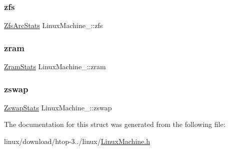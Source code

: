 \mbox{\label{structLinuxMachine___afe18771dfc5352b17d406684ffde417e}} 
\subsubsection{\texorpdfstring{zfs}{zfs}}
{\footnotesize\ttfamily \hyperlink{ZfsArcStats_8h_a2adeccbbba50329f61d34f355e5faddc}{Zfs\+Arc\+Stats} Linux\+Machine\+\_\+\+::zfs}

\mbox{\label{structLinuxMachine___a5118fe9fa61b7db30c667a58b2ede233}} 
\subsubsection{\texorpdfstring{zram}{zram}}
{\footnotesize\ttfamily \hyperlink{ZramStats_8h_a6d52e5ca55176157f75983edcee3edb3}{Zram\+Stats} Linux\+Machine\+\_\+\+::zram}

\mbox{\label{structLinuxMachine___a4b5e481f544c0e56bad364c25eac8751}} 
\subsubsection{\texorpdfstring{zswap}{zswap}}
{\footnotesize\ttfamily \hyperlink{ZswapStats_8h_ad2bd350512b2d43b858fc4632f2c4b26}{Zswap\+Stats} Linux\+Machine\+\_\+\+::zswap}



The documentation for this struct was generated from the following file\+:\begin{DoxyCompactItemize}
\item 
linux/download/htop-\/3../linux/\hyperlink{LinuxMachine_8h}{Linux\+Machine.\+h}\end{DoxyCompactItemize}
